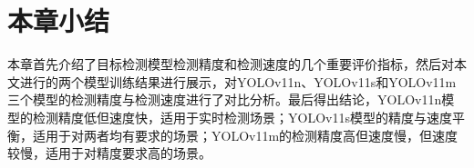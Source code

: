 \section{本章小结}
本章首先介绍了目标检测模型检测精度和检测速度的几个重要评价指标，然后对本文进行的两个模型训练结果进行展示，对YOLOv11n、YOLOv11s和YOLOv11m三个模型的检测精度与检测速度进行了对比分析。最后得出结论，YOLOv11n模型的检测精度低但速度快，适用于实时检测场景；YOLOv11s模型的精度与速度平衡，适用于对两者均有要求的场景；YOLOv11m的检测精度高但速度慢，但速度较慢，适用于对精度要求高的场景。












